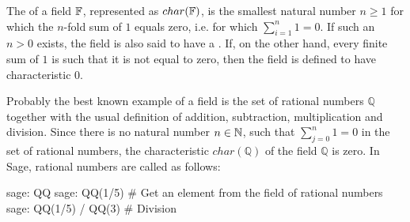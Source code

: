 The  of a field $ \mathbb{F} $, represented as $char(\mathbb{F})$, is the smallest natural number $ n \geq 1 $ for which the $n$-fold sum of $ 1 $ equals zero, i.e. for which $ \sum_{i = 1} ^ n 1 = 0 $. If such an $ n> 0 $ exists, the field is also said to have a . If, on the other hand, every finite sum of $1$ is such that it is not equal to zero, then the field is defined to have characteristic $ 0 $. 
\begin{example} Probably the best known example of a field is the set of rational numbers $\mathbb{Q}$ together with the usual definition of addition, subtraction, multiplication and division. Since there is no natural number $n\in \mathbb{N}$, such that $\sum_{j=0}^n 1 =0$ in the set of rational numbers, the characteristic $char(\mathbb{Q})$ of the field $\mathbb{Q}$ is zero. In Sage, rational numbers are called as follows:
\begin{sagecommandline}
sage: QQ
sage: QQ(1/5) # Get an element from the field of rational numbers
sage: QQ(1/5) / QQ(3) # Division
\end{sagecommandline}
\end{example}
